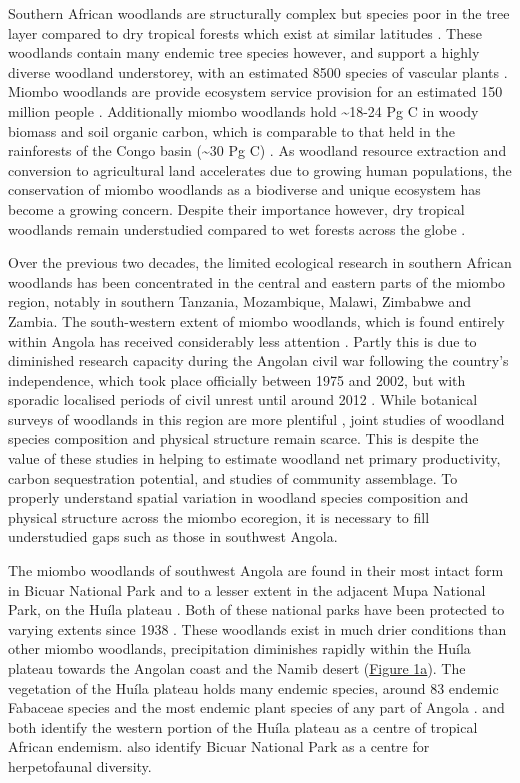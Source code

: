 \documentclass[diversity,article,submit,moreauthors,pdftex]{Definitions/mdpi}
\begin{document}
Southern African woodlands are structurally complex but species poor in the tree layer compared to dry tropical forests which exist at similar latitudes \citep{DRYFLOR2016, Torello-raventos2013}. These woodlands contain many endemic tree species however, and support a highly diverse woodland understorey, with an estimated 8500 species of vascular plants \citep{Frost1996}. Miombo woodlands are provide ecosystem service provision for an estimated 150 million people \citep{Ryan2016}. Additionally miombo woodlands hold \textasciitilde{}18-24 Pg C in woody biomass and soil organic carbon, which is comparable to that held in the rainforests of the Congo basin (\textasciitilde{}30 Pg C) \citep{Mayaux2008}. As woodland resource extraction and conversion to agricultural land accelerates due to growing human populations, the conservation of miombo woodlands as a biodiverse and unique ecosystem has become a growing concern. Despite their importance however, dry tropical woodlands remain understudied compared to wet forests across the globe \citep{Clarke2017}. 

Over the previous two decades, the limited ecological research in southern African woodlands has been concentrated in the central and eastern parts of the miombo region, notably in southern Tanzania, Mozambique, Malawi, Zimbabwe and Zambia. The south-western extent of miombo woodlands, which is found entirely within Angola has received considerably less attention \citep{Huntley2019}. Partly this is due to diminished research capacity during the Angolan civil war following the country's independence, which took place officially between 1975 and 2002, but with sporadic localised periods of civil unrest until around 2012 \citep{Oliveira2015}. While botanical surveys of woodlands in this region are more plentiful \citep{Huntley2019, Figueiredo2009}, joint studies of woodland species composition and physical structure remain scarce. This is despite the value of these studies in helping to estimate woodland net primary productivity, carbon sequestration potential, and studies of community assemblage. To properly understand spatial variation in woodland species composition and physical structure across the miombo ecoregion, it is necessary to fill understudied gaps such as those in southwest Angola.

The miombo woodlands of southwest Angola are found in their most intact form in Bicuar National Park and to a lesser extent in the adjacent Mupa National Park, on the Hu\'{i}la plateau \citep{Chisingui2018}. Both of these national parks have been protected to varying extents since 1938 \cite{Huntley2019}. These woodlands exist in much drier conditions than other miombo woodlands, precipitation diminishes rapidly within the Hu\'{i}la plateau towards the Angolan coast and the Namib desert (\hyperref[plot_map]{Figure 1a}). The vegetation of the Hu\'{i}la plateau holds many endemic species, around 83 endemic Fabaceae species \citep{Soares2007} and the most endemic plant species of any part of Angola \citep{Figueiredo2008}. \citet{Linder2001} and \citet{Droissart2018} both identify the western portion of the Hu\'{i}la plateau as a centre of tropical African endemism. \citet{Baptista2019} also identify Bicuar National Park as a centre for herpetofaunal diversity.
\end{document}
